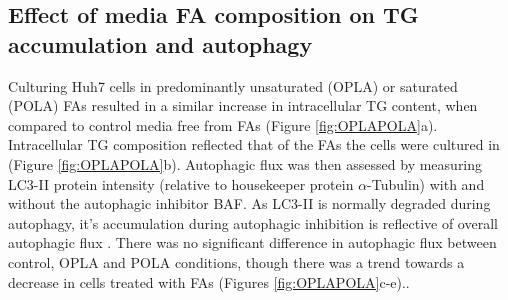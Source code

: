 \subsection{Effect of media FA composition on TG accumulation and autophagy}

Culturing Huh7 cells in predominantly unsaturated (OPLA) or saturated (POLA) FAs resulted in a similar increase in intracellular TG content, when compared to control media free from FAs (Figure \ref{fig:OPLAPOLA}a). Intracellular TG composition reflected that of the FAs the cells were cultured in (Figure \ref{fig:OPLAPOLA}b). Autophagic flux was then assessed by measuring LC3-II protein intensity (relative to housekeeper protein $\alpha$-Tubulin) with and without the autophagic inhibitor BAF. As LC3-II is normally degraded during autophagy, it's accumulation during autophagic inhibition is reflective of overall autophagic flux \cite{DJ2021Guidelines1}. There was no significant difference in autophagic flux between control, OPLA and POLA conditions, though there was a trend towards a decrease in cells treated with FAs (Figures \ref{fig:OPLAPOLA}c-e)..


